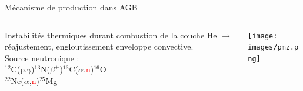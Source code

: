 \documentclass[10pt]{beamer}
\begin{document}

\begin{frame}[fragile]{Mécanisme de production dans AGB}
    \begin{columns}
        \begin{column}{0.3\textwidth}
            Instabilités thermiques durant combustion de la couche He $\rightarrow$ réajustement, engloutissement enveloppe convective. \\
            \vspace{2cm}
            Source neutronique : \\
            $^{12}$C(p,$\gamma$)$^{13}$N($\beta^+$)$^{13}$C($\alpha$,\textcolor{red}{n})$^{16}$O \\
             $^{22}$Ne($\alpha$,\textcolor{red}{n})$^{25}$Mg      
        \end{column}
        \begin{column}{0.7\textwidth}
            \begin{center}
                \texttt{[image: images/pmz.png]}
                \vspace{2cm}
            \end{center}
        \end{column}
    \end{columns}
\end{frame}
\end{document}
